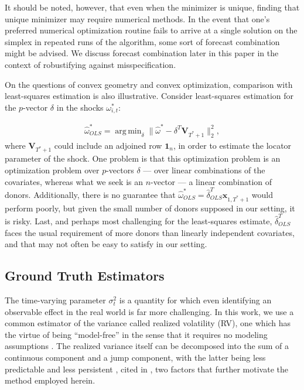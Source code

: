 \documentclass{uiucthesis2021}
\newcommand{\x}{\textbf{x}}
\DeclareMathOperator*{\argmin}{arg\,min} %
\theoremstyle{definition}
\begin{document}
It should be noted, however, that even when the minimizer is unique, finding that unique minimizer may require numerical methods.  In the event that one's preferred numerical optimization routine fails to arrive at a single solution on the simplex in repeated runs of the algorithm, some sort of forecast combination might be advised.  We discuss forecast combination later in this paper in the context of robustifying against misspecification.

On the questions of convex geometry and convex optimization, comparison with least-squares estimation is also illustrative.  Consider least-squares estimation for the $p$-vector $\delta$ in the shocks $\omega^{*}_{i,t}$:

\begin{align*}
 \hat\omega^{*}_{OLS} =\argmin_{\delta}\|\hat{\omega}^{*} - \delta^{T}\textbf{V}_{T^{*}+1}\|^{2}_{2},
\end{align*}
where $\textbf{V}_{T^{*}+1}$ could include an adjoined row $\textbf{1}_{n}$, in order to estimate the locator parameter of the shock.  One problem is that this optimization problem is an optimization problem over $p$-vectors $\delta$ --- over linear combinations of the covariates, whereas what we seek is an $n$-vector --- a linear combination of donors.  Additionally, there is no guarantee that $\hat\omega^{*}_{OLS} = \hat{\delta}_{OLS}^{T}\x_{1,T^{*}+1}$ would perform poorly, but given the small number of donors supposed in our setting, it is risky.  Last, and perhaps most challenging for the least-squares estimate, $\hat{\delta}_{OLS}^{T}$ faces the usual requirement of more donors than linearly independent covariates, and that may not often be easy to satisfy in our setting.

\subsection{Ground Truth Estimators}
    \label{Ground Truth Estimators}
    
    The time-varying parameter $\sigma^{2}_{t}$ is a quantity for which even identifying an observable effect in the real world is far more challenging.  In this work, we use a common estimator of the variance called realized volatility (RV), one which has the virtue of being ``model-free'' in the sense that it requires no modeling assumptions \citep{andersen2010stochastic}.  The realized variance itself can be decomposed into the sum of a continuous component and a jump component, with the latter being less predictable and less persistent \citep{andersen2007roughing}, cited in \citet{de2006forecasting}, two factors that further motivate the method employed herein.
    
\end{document}
